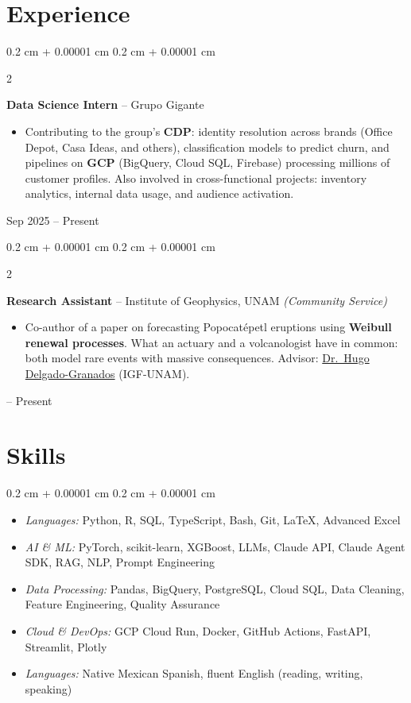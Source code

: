 \documentclass[10pt, letterpaper]{article}
\newenvironment{highlights}{
    \begin{itemize}[
        topsep=0.05 cm,
        parsep=0.05 cm,
        partopsep=0pt,
        itemsep=0pt,
        leftmargin=0.4 cm + 10pt
    ]
}{
    \end{itemize}
}
\newenvironment{highlightsforbulletentries}{
    \begin{itemize}[
        topsep=0.05 cm,
        parsep=0.05 cm,
        partopsep=0pt,
        itemsep=0pt,
        leftmargin=10pt
    ]
}{
    \end{itemize}
}
\newenvironment{onecolentry}{
    \begin{adjustwidth}{
        0.2 cm + 0.00001 cm
    }{
        0.2 cm + 0.00001 cm
    }
}{
    \end{adjustwidth}
}
\newenvironment{twocolentry}[2][]{
    \onecolentry
    \def\secondColumn{#2}
    \setcolumnwidth{\fill, 4.5 cm}
    \begin{paracol}{2}
}{
    \switchcolumn \raggedleft \secondColumn
    \end{paracol}
    \endonecolentry
}
\let\hrefWithoutArrow\href
\renewcommand{\href}[2]{\hrefWithoutArrow{#1}{\ifthenelse{\equal{#2}{}}{ }{#2 }\raisebox{.15ex}{\footnotesize \faExternalLink*}}}
\begin{document}
    \section{Experience}

        \begin{twocolentry}{
            Sep 2025 -- Present
        }
            \textbf{Data Science Intern} -- Grupo Gigante
            \begin{highlights}
                \item Contributing to the group's \textbf{CDP}: identity resolution across brands (Office Depot, Casa Ideas, and others), classification models to predict churn, and pipelines on \textbf{GCP} (BigQuery, Cloud SQL, Firebase) processing millions of customer profiles. Also involved in cross-functional projects: inventory analytics, internal data usage, and audience activation.
            \end{highlights}
        \end{twocolentry}

        \vspace{0.10 cm}

        \begin{twocolentry}{
            2025 -- Present
        }
            \textbf{Research Assistant} -- Institute of Geophysics, UNAM \textit{(Community Service)}
            \begin{highlights}
                \item Co-author of a paper on forecasting Popocatépetl eruptions using \textbf{Weibull renewal processes}. What an actuary and a volcanologist have in common: both model rare events with massive consequences. Advisor: \hrefWithoutArrow{https://scholar.google.com/citations?user=lDD0DZQAAAAJ}{Dr.\ Hugo Delgado-Granados} (IGF-UNAM).
            \end{highlights}
        \end{twocolentry}


    \section{Skills}

\begin{onecolentry}
    \begin{highlightsforbulletentries}
        \item \textit{Languages:} Python, R, SQL, TypeScript, Bash, Git, \LaTeX, Advanced Excel
        \item \textit{AI \& ML:} PyTorch, scikit-learn, XGBoost, LLMs, Claude API, Claude Agent SDK, RAG, NLP, Prompt Engineering
        \item \textit{Data Processing:} Pandas, BigQuery, PostgreSQL, Cloud SQL, Data Cleaning, Feature Engineering, Quality Assurance
        \item \textit{Cloud \& DevOps:} GCP Cloud Run, Docker, GitHub Actions, FastAPI, Streamlit, Plotly
        \item \textit{Languages:} Native Mexican Spanish, fluent English (reading, writing, speaking)
    \end{highlightsforbulletentries}
\end{onecolentry}
\end{document}
